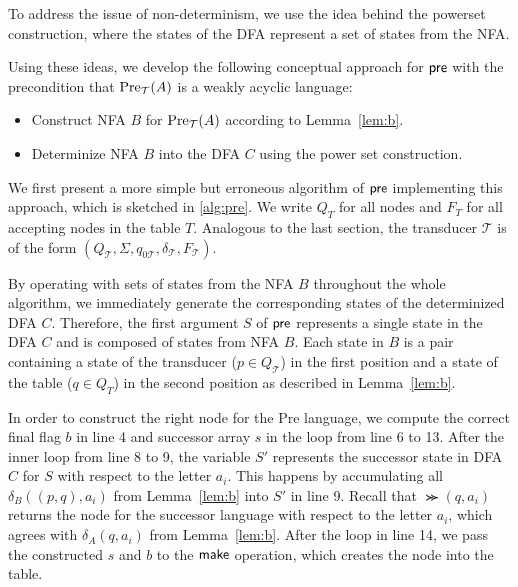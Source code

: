 \par

To address the issue of non-determinism, we use the idea behind the powerset construction, where the states of the DFA represent a set of states from the NFA. 

\par 

Using these ideas, we develop the following conceptual approach for $\operatorname{\textsf{pre}}$ with the precondition that $\operatorname{\text{Pre}}_{\mathcal{T}}(A)$ is a weakly acyclic language:
\begin{itemize}[-,noitemsep]
\item Construct NFA $B$ for $\operatorname{\text{Pre}}_{\mathcal{T}}(A)$ according to Lemma~\ref{lem:b}.
\item Determinize NFA $B$ into the DFA $C$ using the power set construction.
\end{itemize}

We first present a more simple but erroneous algorithm of $\operatorname{\textsf{pre}}$ implementing this approach, which is sketched in \autoref{alg:pre}. We write $Q_{T}$ for all nodes and $F_{T}$ for all accepting nodes in the table $T$. Analogous to the last section, the transducer $\mathcal{T}$ is of the form $(Q_{\mathcal{T}},\Sigma,q_{0\mathcal{T}},\delta_{\mathcal{T}},F_{\mathcal{T}})$.

By operating with sets of states from the NFA $B$ throughout the whole algorithm, we immediately generate the corresponding states of the determinized DFA $C$.
Therefore, the first argument $S$ of $\operatorname{\textsf{pre}}$ represents a single state in the DFA $C$ and is composed of states from NFA $B$.  
Each state in $B$ is a pair containing a state of the transducer ($ p \in Q_{\mathcal{T}}$) in the first position and a state of the table ($ q \in Q_{T}$) in the second position as described in Lemma~\autoref{lem:b}.

In order to construct the right node for the Pre language, we compute the correct final flag $b$ in line 4 and successor array $s$ in the loop from line 6 to 13. After the inner loop from line 8 to 9, the variable $S'$ represents the successor state in DFA $C$ for $S$ with respect to the letter $a_{i}$. This happens by accumulating all $\delta_{B}((p,q),a_{i})$ from Lemma~\autoref{lem:b} into $S'$ in line 9. Recall that $\Succ(q,a_{i})$ returns the node for the successor language with respect to the letter $a_{i}$, which agrees with $\delta_{A}(q,a_{i})$ from Lemma~\autoref{lem:b}.
After the loop in line 14, we pass the constructed $s$ and $b$ to the $\operatorname{\textsf{make}}$ operation, which creates the node into the table.




